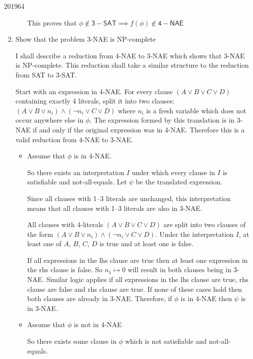 \documentclass[10pt,\jkfside,a4paper]{article}
\begin{document}
\begin{examquestion}{2019}{6}{4}
\begin{enumerate}[label=(\alph*)]
\begin{itemize}
This proves that $\phi \notin \mathsf{3-SAT} \implies f(\phi) \notin \mathsf{4-NAE}$

\end{itemize}

\item Show that the problem 3-NAE is NP-complete

I shall describe a reduction from 4-NAE to 3-NAE which shows that 3-NAE is
NP-complete. This reduction shall take a similar structure to the reduction
from SAT to 3-SAT\@.

Start with an expression in 4-NAE\@. For every clause $(A \vee B \vee C \vee
D)$ containing exactly 4 literals, split it into two clauses: $(A \vee B
\vee n_i) \wedge (\neg n_i \vee C \vee D)$ where $n_i$ is a fresh variable
which does not occur anywhere else in $\phi$. The expression formed by
this translation is in 3-NAE if and only if the original expression was in
4-NAE\@. Therefore this is a valid reduction from 4-NAE to 3-NAE\@.

\begin{itemize}

\item Assume that $\phi$ is in 4-NAE\@.

So there exists an interpretation $I$ under which every clause in $I$ is
satisfiable and not-all-equals. Let $\psi$ be the translated expression.

Since all clauses with 1--3 literals are unchanged, this interpretation
means that all clauses with 1--3 literals are also in 3-NAE\@.

All clauses with 4-literals $(A \vee B \vee C \vee D)$ are split into two
clauses of the form $(A \vee B \vee n_i) \wedge (\neg n_i \vee C \vee D)$.
Under the interpretation $I$, at least one of $A$, $B$, $C$, $D$ is true and
at least one is false.

If all expressions in the lhs clause are true then at least one expression
in the rhs clause is false. So $n_1 \mapsto 0$ will result in both clauses
being in 3-NAE\@. Similar logic applies if all expressions in the lhs clause
are true, rhs clause are false and rhs clause are true. If none of these
cases hold then both clauses are already in 3-NAE\@. Therefore, if $\phi$ is
in 4-NAE then $\psi$ is in 3-NAE\@.

\item Assume that $\phi$ is not in 4-NAE

So there exists some clause in $\phi$ which is not satisfiable and
not-all-equals.


\end{itemize}
\end{enumerate}
\end{examquestion}
\end{document}

